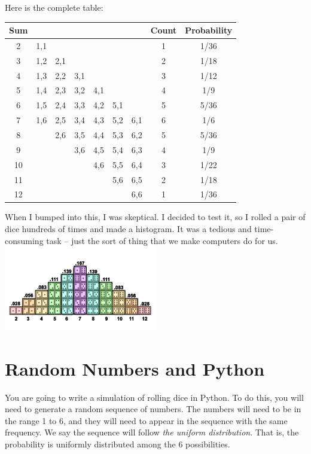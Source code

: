 Here is the complete table:
\begin{tabular}{c| c c c c c c | c | c}
  Sum &     &     &     &     &     &     & Count & Probability \\
  \hline
  2   & 1,1 &     &     &     &     &     &   1    & 1/36 \\
  3   & 1,2 & 2,1 &     &     &     &     &   2    & 1/18 \\
  4   & 1,3 & 2,2 & 3,1 &     &     &     &   3    & 1/12 \\
  5   & 1,4 & 2,3 & 3,2 & 4,1 &     &     &   4    & 1/9 \\
  6   & 1,5 & 2,4 & 3,3 & 4,2 & 5,1 &     &   5    & 5/36 \\
  7   & 1,6 & 2,5 & 3,4 & 4,3 & 5,2 & 6,1 &   6    & 1/6 \\
  8   &     & 2,6 & 3,5 & 4,4 & 5,3 & 6,2 &   5    & 5/36 \\
  9   &     &     & 3,6 & 4,5 & 5,4 & 6,3 &   4    & 1/9 \\
  10  &     &     &     & 4,6 & 5,5 & 6,4 &   3    & 1/22 \\
  11  &     &     &     &     & 5,6 & 6,5 &   2    & 1/18 \\
  12  &     &     &     &     &     & 6,6 &   1    & 1/36
\end{tabular}

When I bumped into this, I was skeptical. I decided to test it, so I
rolled a pair of dice hundreds of times and made a histogram. It was a
tedious and time-consuming task -- just the sort of thing that we make
computers do for us.
\includegraphics[width=0.5\textwidth]{dice_graph.png}
\section{Random Numbers and Python}

You are going to write a simulation of rolling dice in Python. To do
this, you will need to generate a random sequence of numbers. The
numbers will need to be in the range 1 to 6, and they will need to
appear in the sequence with the same frequency.  We say the sequence
will follow \textit{the uniform distribution}.  That is, the
probability is uniformly distributed among the 6 possibilities.

